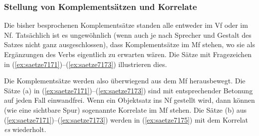 \subsubsection{Stellung von Komplementsätzen und Korrelate}

\label{sec:korrelate}


Die bisher besprochenen Komplementsätze standen alle entweder im Vf oder im Nf.
Tatsächlich ist es ungewöhnlich (wenn auch je nach Sprecher und Gestalt des Satzes nicht ganz ausgeschlossen), dass Komplementsätze im Mf stehen, wo sie als Ergänzungen des Verbs eigentlich zu erwarten wären.
Die Sätze mit Fragezeichen in (\ref{ex:saetze7171})--(\ref{ex:saetze7173}) illustrieren dies.

\begin{exe}
  \ex\label{ex:saetze7171}
  \begin{xlist}
  \end{xlist}
  \ex\label{ex:saetze7172}
  \begin{xlist}
  \end{xlist}
  \ex\label{ex:saetze7173}
  \begin{xlist}
  \end{xlist}
\end{exe}

Die Komplementsätze werden also überwiegend aus dem Mf herausbewegt.
Die Sätze (a) in (\ref{ex:saetze7171})--(\ref{ex:saetze7173}) sind mit entsprechender Betonung auf jeden Fall einwandfrei.
Wenn ein Objektsatz ins Nf gestellt wird, dann können (wie eine sichtbare Spur) sogenannte Korrelate im Mf stehen.
Die Sätze (b) aus (\ref{ex:saetze7171})--(\ref{ex:saetze7173}) werden in (\ref{ex:saetze7175}) mit dem Korrelat \textit{es} wiederholt.

